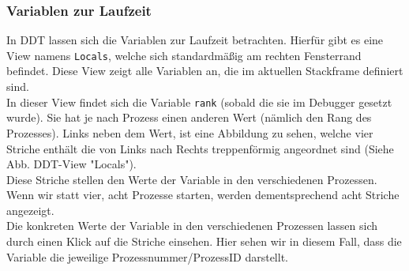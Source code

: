 \documentclass[12pt]{article}
\begin{document}
\begin{sloppypar}
\subsubsection*{Variablen zur Laufzeit}
In DDT lassen sich die Variablen zur Laufzeit betrachten. Hierfür gibt es eine View namens \verb|Locals|, welche sich standardmäßig am rechten Fensterrand befindet. Diese View zeigt alle Variablen an, die im aktuellen Stackframe definiert sind. \\
In dieser View findet sich die Variable \verb|rank| (sobald die sie im Debugger gesetzt wurde). Sie hat je nach Prozess einen anderen Wert (nämlich den Rang des Prozesses). Links neben dem Wert, ist eine Abbildung zu sehen, welche vier Striche enthält die von Links nach Rechts treppenförmig angeordnet sind (Siehe Abb. DDT-View "Locals"). \\
Diese Striche stellen den Werte der Variable in den verschiedenen Prozessen. Wenn wir statt vier, acht Prozesse starten, werden dementsprechend acht Striche angezeigt. \\
Die konkreten Werte der Variable in den verschiedenen Prozessen lassen sich durch einen Klick auf die Striche einsehen. Hier sehen wir in diesem Fall, dass die Variable die jeweilige Prozessnummer/ProzessID darstellt. \\


\end{sloppypar}
\end{document}
